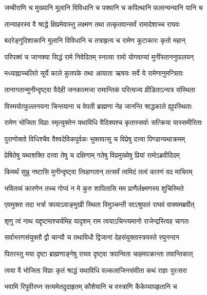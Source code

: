 \twolineshloka
{जम्बीराणि च मुख्यानि मूलानि विविधानि च}
{पक्वानि च कपित्थानि फलान्यन्यानि यानि च} %

\twolineshloka
{तान्याहरस्व वै श्राद्धे क्षिप्रमेवास्तु लक्ष्मण}
{तथा तत्कृतवान्सर्वं रामादेशाच्च राघवः} %

\twolineshloka
{बदरेङ्गुदिशाकानि मूलानि विविधानि च}
{तत्राहृत्य च रामेण कूटाकारः कृतो महान्} %

\twolineshloka
{परिपक्वं च जानक्या सिद्धं रामे निवेदितम्}
{स्नात्वा रामो योगवाप्यां मुनींस्ताननुपालयन्} %

\twolineshloka
{मध्याह्नाच्चलिते सूर्ये काले कुतपके तथा}
{आयाता ऋषयः सर्वे ये रामेणानुमन्त्रिताः} %

\twolineshloka
{तानागतान्मुनीन्दृष्ट्वा वैदेही जनकात्मजा}
{रामान्तिकं परित्यज्य व्रीडिताऽन्यत्र संस्थिता} %

\twolineshloka
{विस्मयोत्फुल्लनयना चिन्तयाना च वेपती}
{ब्राह्मणा नेह जानन्ति श्राद्धकाले ह्युपस्थिताः} %

\twolineshloka
{रामेण भोजिता विप्राः स्मृत्युक्तेन यथाविधि}
{वैदिक्यश्च कृतास्सर्वाः सत्क्रिया यास्समीरिताः} %

\twolineshloka
{पुराणोक्तो विधिश्चैव वैश्वदेविकपूर्वकः}
{भुक्तवत्सु च विप्रेषु दत्त्वा पिण्डान्यथाक्रमम्} %

\twolineshloka
{प्रेषितेषु यथाशक्ति दत्त्वा तेषु च दक्षिणाम्}
{गतेषु विप्रमुख्येषु प्रियां रामोऽब्रवीदिदम्} %

\twolineshloka
{किमर्थं सुभ्रु नष्टासि मुनीन्दृष्ट्वा त्विहागतान्}
{तत्सर्वं त्वमिदं तत्वं कारणं वद माचिरम्} %

\twolineshloka
{भवितव्यं कारणेन तच्च गोप्यं न मे कुरु}
{शापितासि मम प्राणैर्लक्ष्मणस्य शुचिस्मिते} %

\twolineshloka
{एवमुक्ता तदा भर्त्रा त्रपयाऽवाङ्मुखी स्थिता}
{विमुञ्चन्ती साऽश्रुपातं राघवं वाक्यमब्रवीत्} %

\twolineshloka
{शृणु त्वं नाथ यद्दृष्टमाश्चर्यमिह यादृशम्}
{राम त्वयाऽचिन्त्यमानो राजेन्द्रस्त्विह चागतः} %

\twolineshloka
{सर्वाभरणसंयुक्तौ द्वौ चान्यौ च तथाविधौ}
{द्विजानां देहसंयुक्तास्त्रयस्ते रघुनन्दन} %

\twolineshloka
{पितरस्तु मया दृष्टा ब्राह्मणाङ्गेषु राघव}
{दृष्ट्वा त्रपान्विता चाहमपक्रान्ता तवान्तिकात्} %

\twolineshloka
{त्वया वै भोजिता विप्राः कृतं श्राद्धं यथाविधि}
{वल्कलाजिनसंवीता कथं राज्ञः पुरःसरा} %

\twolineshloka
{भवामि रिपुवीरघ्न सत्यमेतदुदाहृतम्}
{कौशेयानि च वस्त्राणि कैकेय्यापहृतानि च} %

